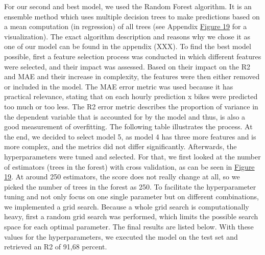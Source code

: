 For our second and best model, we used the Random Forest algorithm. It is an ensemble method which uses multiple decision trees to make predictions based on a mean computation (in regression) of all trees (see Appendix \hyperref[RF_Intro]{Figure 19} for a visualization). The exact algorithm description and reasons why we chose it as one of our model can be found in the appendix (XXX). To find the best model possible, first a feature selection process was conducted in which different features were selected, and their impact was assessed. Based on their impact on the R2 and MAE and their increase in complexity, the features were then either removed or included in the model. The MAE error metric was used because it has practical relevance, stating that on each hourly prediction x bikes were predicted too much or too less. The R2 error metric describes the proportion of variance in the dependent variable that is accounted for by the model and thus, is also a good measurement of overfitting. The following table illustrates the process. At the end, we decided to select model 5, as model 4 has three more features and is more complex, and the metrics did not differ significantly.
Afterwards, the hyperparameters were tuned and selected. For that, we first looked at the number of estimators (trees in the forest) with cross validation, as can be seen in \hyperref[RF_Fig_1]{Figure 19}. At around 250 estimators, the score does not really change at all, so we picked the number of trees in the forest as 250. To facilitate the hyperparameter tuning and not only focus on one single parameter but on different combinations, we implemented a grid search. Because a whole grid search is computationally heavy, first a random grid search was performed, which limits the possible search space for each optimal parameter. The final results are listed below.
With these values for the hyperparameters, we executed the model on the test set and retrieved an R2 of 91,68 percent.

